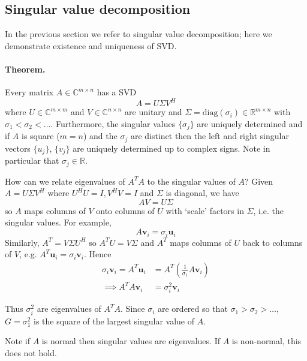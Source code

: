 \documentclass{jknotes}
\begin{document}
\subsection{Singular value decomposition}
In the previous section we refer to singular value decomposition; here we
demonstrate existence and uniqueness of SVD.

\paragraph{Theorem.}
Every matrix $A \in \mathbb{C}^{m \times n}$ has a SVD
\begin{equation}
	A = U \Sigma V^H
\end{equation}
where $U \in \mathbb{C}^{m \times m}$ and $V \in \mathbb{C}^{n \times n}$ are
unitary and $\Sigma = \text{diag}(\sigma_i) \in \mathbb{R}^{m \times n}$ with
$\sigma_1 < \sigma_2 < \dots$.  Furthermore, the singular values
$\{\sigma_j\}$ are uniquely determined and if $A$ is square ($m=n$) and the
$\sigma_j$ are distinct then the left and right singular vectors $\{u_j\}$,
$\{v_j\}$ are uniquely determined up to complex signs. Note in particular that
$\sigma_j \in \mathbb{R}$.

How can we relate eigenvalues of $A^T A$ to the singular values of $A$? Given
$A = U \Sigma V^H$ where $U^H U = I, V^H V = I$ and $\Sigma$ is diagonal, we
have
\begin{equation}
	AV = U\Sigma
\end{equation}
so $A$ maps columns of $V$ onto columns of $U$ with `scale' factors in
$\Sigma$, i.e. the singular values. For example,
\begin{equation}
	A\symbf{v}_i = \sigma_i \symbf{u}_i
\end{equation}
Similarly, $A^T = V \Sigma U^H$ so $A^T U = V \Sigma$ and $A^T$ maps columns
of $U$ back to columns of $V$, e.g. $A^T \symbf{u}_i = \sigma_i \symbf{v}_i$.
Hence
\begin{align}
	\sigma_i \symbf{v}_i = A^T \symbf{u}_i &= A^T \left(\frac{1}{\sigma_1} A
		\symbf{v}_i\right) \\
	\implies A^T A \symbf{v}_i &= \sigma_i^2 \symbf{v}_i
\end{align}

Thus $\sigma_i^2$ are eigenvalues of $A^T A$. Since $\sigma_i$ are ordered so
that $\sigma_1 > \sigma_2 > \dots$, $G = \sigma_1^2$ is the square of the
largest singular value of $A$.  

Note if $A$ is normal then singular values are eigenvalues. If $A$ is
non-normal, this does not hold.
\end{document}
